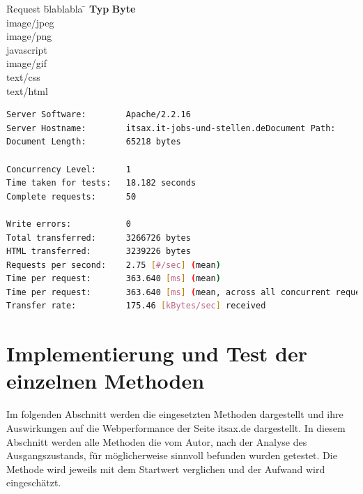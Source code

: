 \begin{tabbing}
Request \quad\= blablabla \quad\= \kill
\textbf{Typ} 	 \> \textbf{Byte} \\
image/jpeg	\\
image/png	\\
javascript	\\
image/gif	\\
text/css	\\
text/html	\\

\end{tabbing}
\begin{lstlisting}[language=bash,label=Ausgabe von ab,caption=Ausgabe von ab]
Server Software:        Apache/2.2.16
Server Hostname:        itsax.it-jobs-und-stellen.deDocument Path:          /
Document Length:        65218 bytes

Concurrency Level:      1
Time taken for tests:   18.182 seconds
Complete requests:      50

Write errors:           0
Total transferred:      3266726 bytes
HTML transferred:       3239226 bytes
Requests per second:    2.75 [#/sec] (mean)
Time per request:       363.640 [ms] (mean)
Time per request:       363.640 [ms] (mean, across all concurrent requests)
Transfer rate:          175.46 [kBytes/sec] received
\end{lstlisting}




\section{Implementierung und Test der einzelnen Methoden}
Im folgenden Abschnitt werden die eingesetzten Methoden dargestellt und ihre Auswirkungen auf die Webperformance der Seite itsax.de dargestellt. 
In diesem Abschnitt werden alle Methoden die vom Autor, nach der Analyse des Ausgangszustands, für möglicherweise sinnvoll befunden wurden getestet. Die Methode wird jeweils mit dem Startwert verglichen und der Aufwand wird eingeschätzt.
